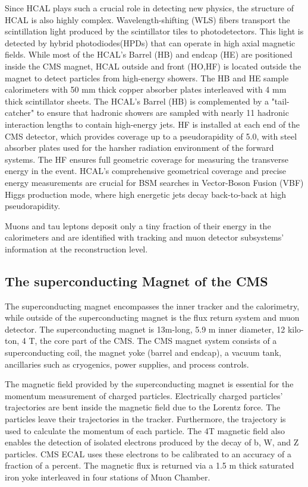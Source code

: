 Since HCAL plays such a crucial role in detecting new physics, the structure of HCAL is also highly complex.
Wavelength-shifting (WLS) fibers transport the scintillation light produced by the scintillator tiles to photodetectors.
This light is detected by hybrid photodiodes(HPDs) that can operate in high axial magnetic fields.
While most of the HCAL's Barrel (HB) and endcap (HE) are positioned inside the CMS magnet, HCAL outside and front (HO,HF) is located outside the magnet to detect particles from high-energy showers.
The HB and HE sample calorimeters with 50 mm thick copper absorber plates interleaved with 4 mm thick scintillator sheets.
The HCAL's Barrel (HB) is complemented by a "tail-catcher" to ensure that hadronic showers are sampled with nearly 11 hadronic interaction lengths to contain high-energy jets.
HF is installed at each end of the CMS detector, which provides coverage up to a pseudorapidity of 5.0, with steel absorber plates used for the harsher radiation environment of the forward systems.
The HF ensures full geometric coverage for measuring the transverse energy in the event.
HCAL's comprehensive geometrical coverage and precise energy measurements are crucial for BSM searches in Vector-Boson Fusion (VBF) Higgs production mode, where high energetic jets decay back-to-back at high pseudorapidity.

Muons and tau leptons deposit only a tiny fraction of their energy in the calorimeters and are identified with tracking and muon detector subsystems' information at the reconstruction level.
\subsection{The superconducting Magnet  of the CMS}
The superconducting magnet encompasses the inner tracker and the calorimetry, while outside of the superconducting magnet is the flux return system and muon detector.
The superconducting magnet is 13m-long, 5.9 m inner diameter, 12 kilo-ton, 4 T, the core part of the CMS.
The CMS magnet system consists of a superconducting coil, the magnet yoke (barrel and endcap), a vacuum tank, ancillaries such as cryogenics, power supplies, and process controls.

The magnetic field provided by the superconducting magnet is essential for the momentum measurement of charged particles.
Electrically charged particles' trajectories are bent inside the magnetic field due to the Lorentz force.
The particles leave their trajectories in the tracker. 
Furthermore, the trajectory is used to calculate the momentum of each particle.
The 4T magnetic field also enables the detection of isolated electrons produced by the decay of b, W, and Z particles.
CMS ECAL uses these electrons to be calibrated to an accuracy of a fraction of a percent.
The magnetic flux is returned via a 1.5 m thick saturated iron yoke interleaved in four stations of Muon Chamber.
